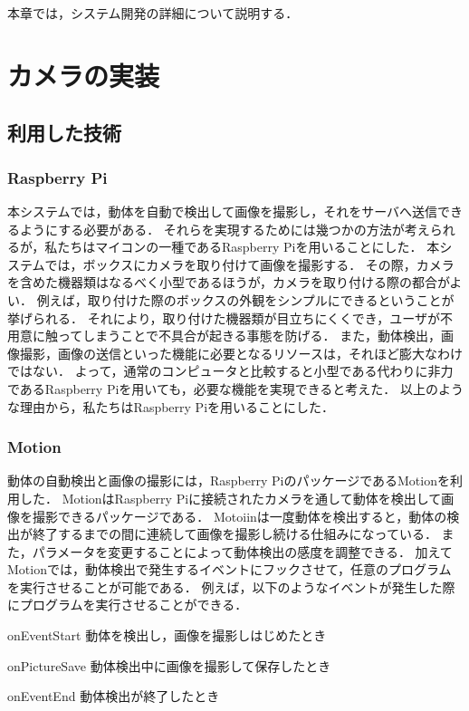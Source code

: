 \documentclass[../report]{subfiles}
\begin{document}
本章では，システム開発の詳細について説明する．


\section{カメラの実装} \label{sec:6_camera}
\subsection{利用した技術} \label{sec:used-camera-technology}
\subsubsection{Raspberry Pi}
本システムでは，動体を自動で検出して画像を撮影し，それをサーバへ送信できるようにする必要がある．
それらを実現するためには幾つかの方法が考えられるが，私たちはマイコンの一種であるRaspberry Piを用いることにした．
本システムでは，ボックスにカメラを取り付けて画像を撮影する．
その際，カメラを含めた機器類はなるべく小型であるほうが，カメラを取り付ける際の都合がよい．
例えば，取り付けた際のボックスの外観をシンプルにできるということが挙げられる．
それにより，取り付けた機器類が目立ちにくくでき，ユーザが不用意に触ってしまうことで不具合が起きる事態を防げる．
また，動体検出，画像撮影，画像の送信といった機能に必要となるリソースは，それほど膨大なわけではない．
よって，通常のコンピュータと比較すると小型である代わりに非力であるRaspberry Piを用いても，必要な機能を実現できると考えた．
以上のような理由から，私たちはRaspberry Piを用いることにした．

\subsubsection{Motion}
動体の自動検出と画像の撮影には，Raspberry PiのパッケージであるMotionを利用した．
MotionはRaspberry Piに接続されたカメラを通して動体を検出して画像を撮影できるパッケージである．
Motoiinは一度動体を検出すると，動体の検出が終了するまでの間に連続して画像を撮影し続ける仕組みになっている．
また，パラメータを変更することによって動体検出の感度を調整できる．
加えてMotionでは，動体検出で発生するイベントにフックさせて，任意のプログラムを実行させることが可能である．
例えば，以下のようなイベントが発生した際にプログラムを実行させることができる．
\begin{description}
    \item{onEventStart} 動体を検出し，画像を撮影しはじめたとき
    \item{onPictureSave} 動体検出中に画像を撮影して保存したとき
    \item{onEventEnd} 動体検出が終了したとき
\end{description}
\end{document}
